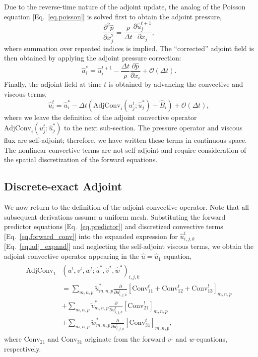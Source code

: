 \documentclass[letterpaper,10pt]{article}
\numberwithin{equation}{section}
\newcommand{\pp}[2]{\frac{\partial #1}{\partial #2}}
\newcommand{\wt}[1]{\widetilde{#1}}
\newcommand{\wh}[1]{\widehat{#1}}
\begin{document}
Due to the reverse-time nature of the adjoint update, the analog of
the Poisson equation [Eq.~\eqref{eq.poisson}] is solved first to
obtain the adjoint pressure,
\begin{equation}
  \frac{\partial^2 \wh{p}}{\partial x_j^2} = \frac{\rho}{\Delta
    t}\pp{\wh{u}_j^{t+1}}{x_j},
\end{equation}
where summation over repeated indices is implied. The ``corrected''
adjoint field is then obtained by applying the adjoint pressure
correction:
\begin{equation}
  \wh{u}_i^* = \wh{u}_i^{t+1} - \frac{\Delta t}{\rho}\pp{\wh{p}}{x_i}
  + \mathcal{O}(\Delta t).
\end{equation}
Finally, the adjoint field at time $t$ is obtained by advancing the
convective and viscous terms,
\begin{equation}
  \wh{u}_i^t = \wh{u}_i^* - \Delta
  t\left(\mathrm{AdjConv}_i(u_j^{t};\wh{u}_j^*) - \wh{B}_i\right) +
  \mathcal{O}(\Delta t),
  \label{eq.adj_predictor}
\end{equation}
where we leave the definition of the adjoint convective operator
$\mathrm{AdjConv}_i(u_j^{t};\wh{u}_j^*)$ to the next
sub-section. The pressure operator and viscous flux are
self-adjoint; therefore, we have written these terms in continuous
space. The nonlinear convective terms are not self-adjoint and require
consideration of the spatial discretization of the forward equations.


\subsection{Discrete-exact Adjoint}
We now return to the definition of the adjoint convective
operator. Note that all subsequent derivations assume a uniform
mesh. Substituting the forward predictor equations
[Eq.~\eqref{eq.predictor}] and discretized convective terms
[Eq.~\eqref{eq.forward_conv}] into the expanded expression for
$\wh{u}_{i,j,k}^t$ [Eq.~\eqref{eq.adj_expand}] and neglecting the
self-adjoint viscous terms, we obtain the adjoint convective operator
appearing in the $\wh{u}=\wh{u}_1$ equation,
\begin{align}
  \begin{split}
    \mathrm{AdjConv}_1 &\left(u^t,v^t,w^t;\wh{u}^*,\wh{v}^*,\wh{w}^*\right)_{i,j,k} \\
    &=\sum_{m,n,p}\wt{u}_{m,n,p}^*\pp{}{u_{i,j,k}^t}\left[
      \mathrm{Conv}_{11}^t + \mathrm{Conv}_{12}^t + \mathrm{Conv}_{13}^t \right]_{m,n,p} \\
    &+\sum_{m,n,p}\wt{v}_{m,n,p}^*\pp{}{u_{i,j,k}^t}\left[\mathrm{Conv}_{21}^t\right]_{m,n,p} \\
    &+\sum_{m,n,p}\wt{w}_{m,n,p}^*\pp{}{u_{i,j,k}^t}\left[\mathrm{Conv}_{31}^t\right]_{m,n,p},
    \label{eq.adj_conv}
  \end{split}
\end{align}
where $\mathrm{Conv}_{21}$ and $\mathrm{Conv}_{31}$ originate from the
forward $v$- and $w$-equations, respectively.
\end{document}
